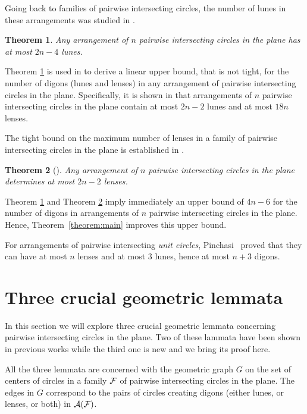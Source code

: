 \documentclass[11pt,a4paper]{article}
\newcommand{\F}{{\cal{F}}}
\newcommand{\A}{{\cal{A}}}
\newtheorem{theorem}{Theorem}
\begin{document}
Going back to families of pairwise intersecting circles, the number of lunes in these arrangements was studied in \cite{ALPS01}. 

\begin{theorem}\label{theorem:lunes}
Any arrangement of $n$ pairwise intersecting circles in the plane 
has at most $2n-4$ lunes.
\end{theorem}

Theorem \ref{theorem:lunes} is used in \cite{ALPS01}
to derive a linear upper bound, that is not tight, for the number of digons (lunes and lenses) in any arrangement of pairwise intersecting circles in the plane. 
Specifically, it is shown in \cite{ALPS01} that arrangements of $n$ pairwise intersecting circles in the plane contain at most $2n-2$ lunes and at most $18n$ lenses.

The tight bound on the maximum number of lenses in a family of pairwise intersecting circles in the plane is established in \cite{P24}.

\begin{theorem}[\cite{P24}]\label{theorem:lenses}
Any arrangement of $n$ pairwise intersecting circles in the plane determines at most $2n-2$ lenses.
\end{theorem}

Theorem \ref{theorem:lunes} and Theorem \ref{theorem:lenses} imply immediately an upper bound of $4n-6$ for the number of digons 
in arrangements of $n$ pairwise intersecting
circles in the plane.
Hence, Theorem~\ref{theorem:main} improves this upper bound.

For arrangements of pairwise intersecting \emph{unit circles}, Pinchasi~\cite{Pinchasi02} proved that they can have at most $n$ lenses and at most $3$ lunes, hence at most $n+3$ digons.

\section{Three crucial geometric lemmata}

In this section we will explore three crucial geometric lemmata concerning pairwise intersecting circles in the plane. Two of these lammata have been shown in previous works
while the third one is new and we bring its proof here.

All the three lemmata are concerned with 
the geometric graph $G$ on the set of centers of circles in a family $\F$ of pairwise intersecting circles in the plane. The edges in $G$ correspond to the pairs of circles creating digons (either lunes, or lenses, or both) in $\A(\F)$.
\end{document}
